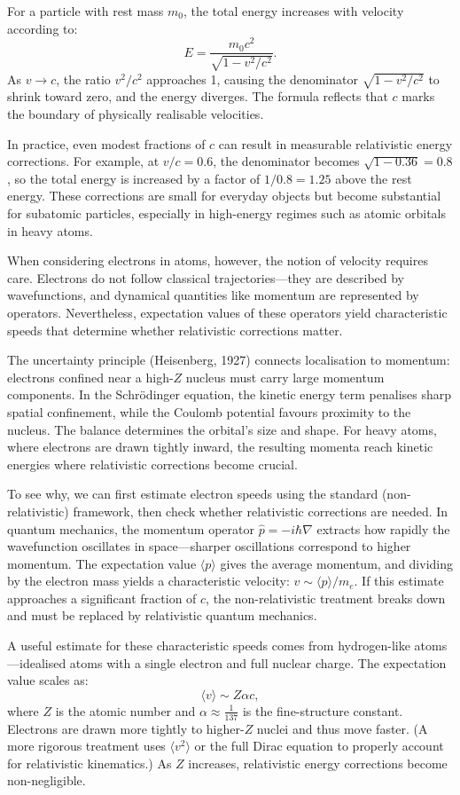 For a particle with rest mass \( m_0 \), the total energy increases with velocity according to:
\[
E = \frac{m_0 c^2}{\sqrt{1 - v^2/c^2}}.
\]
As \( v \to c \), the ratio \( v^2/c^2 \) approaches 1, causing the denominator \( \sqrt{1 - v^2/c^2} \) to shrink toward zero, and the energy diverges. The formula reflects that \( c \) marks the boundary of physically realisable velocities.

In practice, even modest fractions of \( c \) can result in measurable relativistic energy corrections. For example, at \( v/c = 0.6 \), the denominator becomes \( \sqrt{1 - 0.36} = 0.8 \), so the total energy is increased by a factor of \( 1/0.8 = 1.25 \) above the rest energy. These corrections are small for everyday objects but become substantial for subatomic particles, especially in high-energy regimes such as atomic orbitals in heavy atoms.

When considering electrons in atoms, however, the notion of velocity requires care. Electrons do not follow classical trajectories—they are described by wavefunctions, and dynamical quantities like momentum are represented by operators. Nevertheless, expectation values of these operators yield characteristic speeds that determine whether relativistic corrections matter.

The uncertainty principle (Heisenberg, 1927) connects localisation to momentum: electrons confined near a high-$Z$ nucleus must carry large momentum components. In the Schrödinger equation, the kinetic energy term penalises sharp spatial confinement, while the Coulomb potential favours proximity to the nucleus. The balance determines the orbital's size and shape. For heavy atoms, where electrons are drawn tightly inward, the resulting momenta reach kinetic energies where relativistic corrections become crucial.

To see why, we can first estimate electron speeds using the standard (non-relativistic) framework, then check whether relativistic corrections are needed. In quantum mechanics, the momentum operator $\hat{p} = -i\hbar \nabla$ extracts how rapidly the wavefunction oscillates in space—sharper oscillations correspond to higher momentum. The expectation value $\langle p \rangle$ gives the average momentum, and dividing by the electron mass yields a characteristic velocity: $v \sim \langle p \rangle / m_e$. If this estimate approaches a significant fraction of $c$, the non-relativistic treatment breaks down and must be replaced by relativistic quantum mechanics.

A useful estimate for these characteristic speeds comes from hydrogen-like atoms—idealised atoms with a single electron and full nuclear charge. The expectation value scales as:
\[
\langle v \rangle \sim Z\alpha c,
\]
where \( Z \) is the atomic number and \( \alpha \approx \tfrac{1}{137} \) is the fine-structure constant. Electrons are drawn more tightly to higher-$Z$ nuclei and thus move faster. (A more rigorous treatment uses \( \langle v^2 \rangle \) or the full Dirac equation to properly account for relativistic kinematics.) As \( Z \) increases, relativistic energy corrections become non-negligible.

